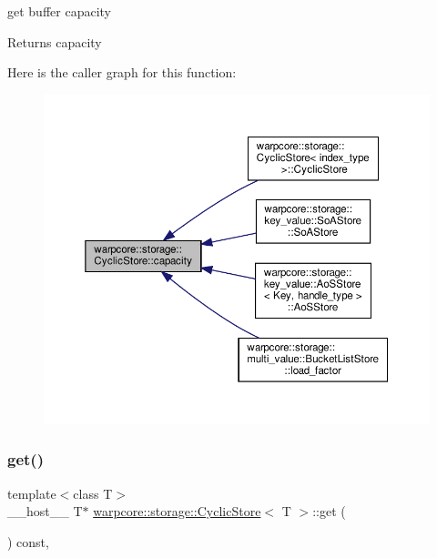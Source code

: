 get buffer capacity 

\begin{DoxyReturn}{Returns}
capacity 
\end{DoxyReturn}
Here is the caller graph for this function\+:
\nopagebreak
\begin{figure}[H]
\begin{center}
\leavevmode
\includegraphics[width=350pt]{classwarpcore_1_1storage_1_1CyclicStore_acc4bfbb9b10868a193301d0ec5a46711_icgraph}
\end{center}
\end{figure}
\mbox{\label{classwarpcore_1_1storage_1_1CyclicStore_ab475e047f32b8a8358ea6b78dfe2536d}} 
\subsubsection{\texorpdfstring{get()}{get()}}
{\footnotesize\ttfamily template$<$class T$>$ \\
\+\_\+\+\_\+host\+\_\+\+\_\+ T$\ast$ \hyperlink{classwarpcore_1_1storage_1_1CyclicStore}{warpcore\+::storage\+::\+Cyclic\+Store}$<$ T $>$\+::get (\begin{DoxyParamCaption}{ }\end{DoxyParamCaption}) const\hspace{0.3cm}{\ttfamily [inline]}, {\ttfamily [noexcept]}}



